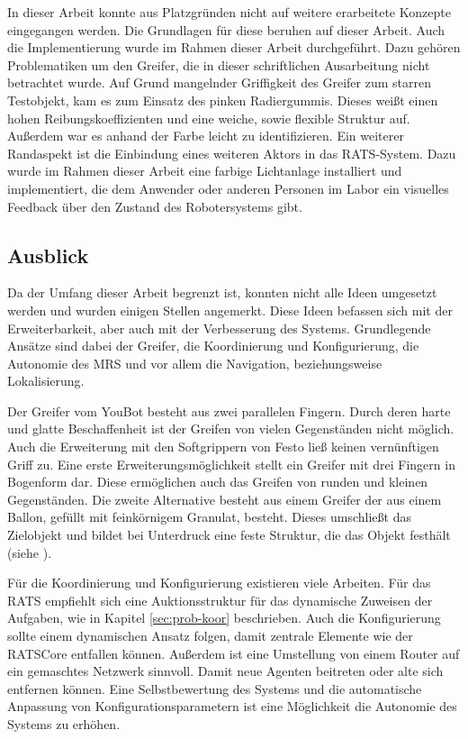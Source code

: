 In dieser Arbeit konnte aus Platzgründen nicht auf weitere erarbeitete Konzepte eingegangen werden. Die Grundlagen für diese beruhen auf dieser Arbeit. Auch die Implementierung wurde im Rahmen dieser Arbeit durchgeführt. Dazu gehören Problematiken um den Greifer, die in dieser schriftlichen Ausarbeitung nicht betrachtet wurde. Auf Grund mangelnder Griffigkeit des Greifer zum starren Testobjekt, kam es zum Einsatz des pinken Radiergummis. Dieses weißt einen hohen Reibungskoeffizienten und eine weiche, sowie flexible Struktur auf. Außerdem war es anhand der Farbe leicht zu identifizieren. Ein weiterer Randaspekt ist die Einbindung eines weiteren Aktors in das RATS-System. Dazu wurde im Rahmen dieser Arbeit eine farbige Lichtanlage installiert und implementiert, die dem Anwender oder anderen Personen im Labor ein visuelles Feedback über den Zustand des Robotersystems gibt.

\subsection{Ausblick}
\label{sec:ausblick}
Da der Umfang dieser Arbeit begrenzt ist, konnten nicht alle Ideen umgesetzt werden und wurden einigen Stellen angemerkt. Diese Ideen befassen sich mit der Erweiterbarkeit, aber auch mit der Verbesserung des Systems. Grundlegende Ansätze sind dabei der Greifer, die Koordinierung und Konfigurierung, die Autonomie des MRS und vor allem die Navigation, beziehungsweise Lokalisierung.

Der Greifer vom YouBot besteht aus zwei parallelen Fingern. Durch deren harte und glatte Beschaffenheit ist der Greifen von vielen Gegenständen nicht möglich. Auch die Erweiterung mit den Softgrippern von Festo ließ keinen vernünftigen Griff zu. Eine erste Erweiterungsmöglichkeit stellt ein Greifer mit drei Fingern in Bogenform dar. Diese ermöglichen auch das Greifen von runden und kleinen Gegenständen. Die zweite Alternative besteht aus einem Greifer der aus einem Ballon, gefüllt mit feinkörnigem Granulat, besteht. Dieses umschließt das Zielobjekt und bildet bei Unterdruck eine feste Struktur, die das Objekt festhält (siehe \cite{amend2012positive}).

Für die Koordinierung und Konfigurierung existieren viele Arbeiten. Für das RATS empfiehlt sich eine Auktionsstruktur für das dynamische Zuweisen der Aufgaben, wie in Kapitel \ref{sec:prob-koor} beschrieben. Auch die Konfigurierung sollte einem dynamischen Ansatz folgen, damit zentrale Elemente wie der RATSCore entfallen können. Außerdem ist eine Umstellung von einem Router auf ein gemaschtes Netzwerk sinnvoll. Damit neue Agenten beitreten oder alte sich entfernen können. Eine Selbstbewertung des Systems und die automatische Anpassung von Konfigurationsparametern ist eine Möglichkeit die Autonomie des Systems zu erhöhen.

